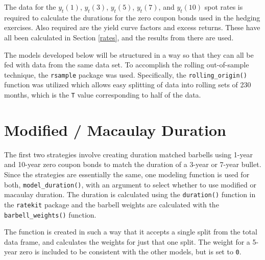 \documentclass[openany]{book}
\theoremstyle{definition}
\theoremstyle{definition}
\theoremstyle{definition}
\theoremstyle{remark}
\begin{document}
The data for the \(y_t(1)\), \(y_t(3)\), \(y_t(5)\), \(y_t(7)\), and
\(y_t(10)\) spot rates is required to calculate the durations for the
zero coupon bonds used in the hedging exercises. Also required are the
yield curve factors and excess returns. These have all been calculated
in Section \ref{rates}, and the results from there are used.

\small

\normalsize

The models developed below will be structured in a way so that they can
all be fed with data from the same data set. To accomplish the rolling
out-of-sample technique, the \texttt{rsample} package was used.
Specifically, the \texttt{rolling\_origin()} function was utilized which
allows easy splitting of data into rolling sets of 230 months, which is
the \texttt{T} value corresponding to half of the data.

\small

\normalsize

\small

\normalsize

\small

\normalsize

\small

\normalsize

\hypertarget{modified-macaulay-duration}{%
\section{Modified / Macaulay
Duration}\label{modified-macaulay-duration}}

The first two strategies involve creating duration matched barbells
using 1-year and 10-year zero coupon bonds to match the duration of a
3-year or 7-year bullet. Since the strategies are essentially the same,
one modeling function is used for both, \texttt{model\_duration()}, with
an argument to select whether to use modified or macaulay duration. The
duration is calculated using the \texttt{duration()} function in the
\texttt{ratekit} package and the barbell weights are calculated with the
\texttt{barbell\_weights()} function.

The function is created in such a way that it accepts a single split
from the total data frame, and calculates the weights for just that one
split. The weight for a 5-year zero is included to be consistent with
the other models, but is set to \texttt{0}.

\small

\normalsize
\end{document}
